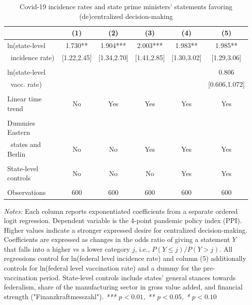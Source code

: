 \begin{table}[htbp] 
	\centering
\caption{Covid-19 incidence rates and state prime ministers' statements favoring (de)centralized decision-making}
 \label{tb.mainreg}
\begin{tabular}{lccccc} \toprule
    & (1) & (2) & (3) & (4) & (5) \\ \midrule
ln(state-level  & 1.730** & 1.904*** & 2.003*** & 1.983** & 1.985** \\
\, incidence rate)	& [1.22,2.45] & [1.34,2.70]  & [1.41,2.85]  & [1.30,3.02]  & [1.29,3.06] \\
 & & & & & \\
ln(state-level  &  &  &  &  & 0.806 \\
\, vacc. rate)		&  &  &  &  & [0.606,1.072] \\
		& & & & & \\
Linear time trend & No & Yes & Yes & Yes & Yes \\
		& & & & & \\
Dummies Eastern  &    &    &     &     & \\
\,  states and Berlin  & No & No & Yes & Yes & Yes \\ 
		& & & & & \\
State-level controls & No & No & No & Yes & Yes \\ \\ \midrule
 Observations & 600 & 600 & 600 & 600 & 600 \\		\bottomrule
\end{tabular}
\label{tb.reg01}
\begin{minipage}{\textwidth}
	\small
\textit{Notes:} Each column reports exponentiated coefficients from a separate ordered logit regression. Dependent variable is the 4-point pandemic policy index (PPI). Higher values indicate a stronger expressed desire for centralized decision-making. Coefficients are expressed as changes in the odds ratio of giving a statement $Y$ that falls into a higher vs a lower category $j$, i.e., $P(Y\leq j)/P(Y > j)$. All regressions control for ln(federal level incidence rate) and column (5) additionally controls for ln(federal level vaccination rate) and a dummy for the pre-vaccination period. State-level controls include states' general stances towards federalism, share of the manufacturing sector in gross value added, and financial strength ("Finanzkraftmesszahl"). \newline \textit{*** $p < 0.01$, ** $p < 0.05$, * $p < 0.10$}
	\end{minipage}
\end{table}